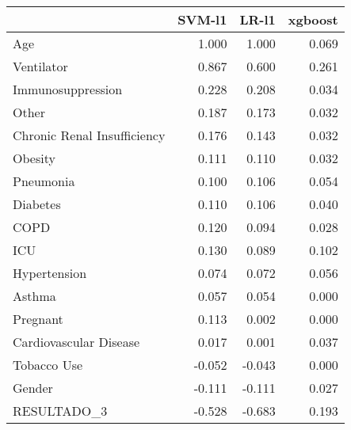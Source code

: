 \begin{tabular}{lrrr}
\toprule
{} &  SVM-l1 &  LR-l1 &  xgboost \\
\midrule
Age                         &   1.000 &  1.000 &    0.069 \\
Ventilator                  &   0.867 &  0.600 &    0.261 \\
Immunosuppression           &   0.228 &  0.208 &    0.034 \\
Other                       &   0.187 &  0.173 &    0.032 \\
Chronic Renal Insufficiency &   0.176 &  0.143 &    0.032 \\
Obesity                     &   0.111 &  0.110 &    0.032 \\
Pneumonia                   &   0.100 &  0.106 &    0.054 \\
Diabetes                    &   0.110 &  0.106 &    0.040 \\
COPD                        &   0.120 &  0.094 &    0.028 \\
ICU                         &   0.130 &  0.089 &    0.102 \\
Hypertension                &   0.074 &  0.072 &    0.056 \\
Asthma                      &   0.057 &  0.054 &    0.000 \\
Pregnant                    &   0.113 &  0.002 &    0.000 \\
Cardiovascular Disease      &   0.017 &  0.001 &    0.037 \\
Tobacco Use                 &  -0.052 & -0.043 &    0.000 \\
Gender                      &  -0.111 & -0.111 &    0.027 \\
RESULTADO\_3                 &  -0.528 & -0.683 &    0.193 \\
\bottomrule
\end{tabular}
